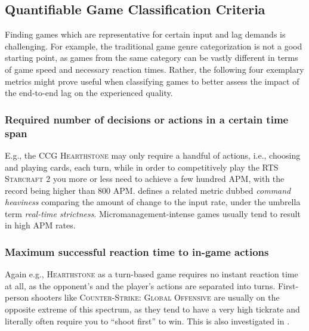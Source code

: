 


\subsection{Quantifiable Game Classification Criteria}

Finding games which are representative for certain input and lag demands is challenging. For example, the traditional game genre categorization is not a good starting point, as games from the same category can be vastly different in terms of game speed and necessary reaction times. Rather, the following four exemplary metrics might prove useful when classifying games to better assess the impact of the end-to-end lag on the experienced quality.

\subsubsection{Required number of decisions or actions in a certain time span} E.g., the \gls{CCG} \textsc{Hearthstone} may only require a handful of actions, i.e., choosing and playing cards, each turn, while in order to competitively play the \gls{RTS} \textsc{Starcraft 2} you more or less need to achieve a few hundred \gls{APM}, with the record being higher than $800$ \gls{APM}. \cite{6404025} defines a related metric dubbed \textit{command heaviness} comparing the amount of change to the input rate, under the umbrella term \textit{real-time strictness}. Micromanagement-intense games usually tend to result in high APM rates.

\subsubsection{Maximum successful reaction time to in-game actions} Again e.g., \textsc{Hearthstone} as a turn-based game requires no instant reaction time at all, as the opponent's and the player's actions are separated into turns. First-person shooters like \textsc{Counter-Strike: Global Offensive} are usually on the opposite extreme of this spectrum, as they tend to have a very high tickrate and literally often require you to ``shoot first'' to win. This is also investigated in \cite{Claypool:2006:LPA:1167838.1167860}.

